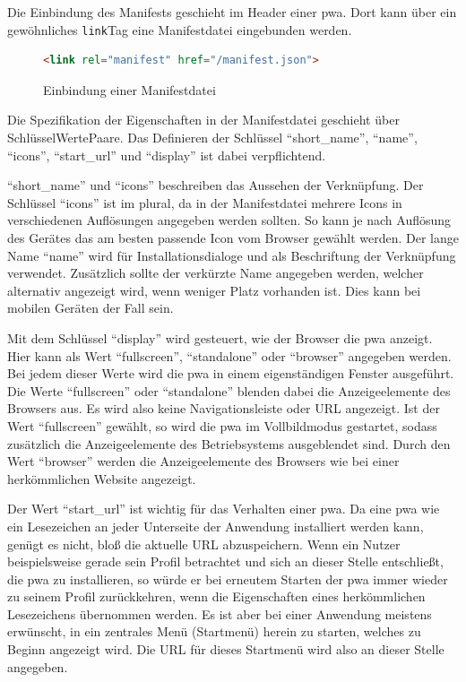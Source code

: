 \documentclass[12pt, parskip=half]{scrartcl}       %
\begin{document}
Die Einbindung des Manifests geschieht im Header einer \ac{pwa}.
Dort kann über ein gewöhnliches \texttt{link}\-Tag eine Manifestdatei eingebunden werden.

\begin{figure}[h]
\begin{lstlisting}[language=HTML]
                <link rel="manifest" href="/manifest.json">
\end{lstlisting}
\caption{Einbindung einer Manifestdatei}
\label{fig:html_linkmanifest}
\end{figure}

Die Spezifikation der Eigenschaften in der Manifestdatei geschieht über Schlüssel\-Werte\-Paare.
Das Definieren der Schlüssel \enquote{short\_name}, \enquote{name}, \enquote{icons}, \enquote{start\_url} und \enquote{display} ist dabei verpflichtend.

\enquote{short\_name} und \enquote{icons} beschreiben das Aussehen der Verknüpfung.
Der Schlüssel \enquote{icons} ist im plural, da in der Manifestdatei mehrere Icons in verschiedenen Auflösungen angegeben werden sollten.
So kann je nach Auflösung des Gerätes das am besten passende Icon vom Browser gewählt werden.
Der lange Name \enquote{name} wird für Installationsdialoge und als Beschriftung der Verknüpfung verwendet.
Zusätzlich sollte der verkürzte Name angegeben werden, welcher alternativ angezeigt wird, wenn weniger Platz vorhanden ist\cite{chromedevs_manifestname}.
Dies kann bei mobilen Geräten der Fall sein.

Mit dem Schlüssel \enquote{display} wird gesteuert, wie der Browser die \ac{pwa} anzeigt.
Hier kann als Wert \enquote{fullscreen}, \enquote{standalone} oder \enquote{browser} angegeben werden.
Bei jedem dieser Werte wird die \ac{pwa} in einem eigenständigen Fenster ausgeführt.
Die Werte \enquote{fullscreen} oder \enquote{standalone} blenden dabei die Anzeigeelemente des Browsers aus.
Es wird also keine Navigationsleiste oder URL angezeigt.
Ist der Wert \enquote{fullscreen} gewählt, so wird die \ac{pwa} im Vollbildmodus gestartet, sodass zusätzlich die Anzeigeelemente des Betriebsystems ausgeblendet sind.
Durch den Wert \enquote{browser} werden die Anzeigeelemente des Browsers wie bei einer herkömmlichen Website angezeigt\cite{googledev_manifest}.

Der Wert \enquote{start\_url} ist wichtig für das Verhalten einer \ac{pwa}.
Da eine \ac{pwa} wie ein Lesezeichen an jeder Unterseite der Anwendung installiert werden kann, genügt es nicht, bloß die aktuelle URL abzuspeichern.
Wenn ein Nutzer beispielsweise gerade sein Profil betrachtet und sich an dieser Stelle entschließt, die \ac{pwa} zu installieren, so würde er bei erneutem Starten der \ac{pwa} immer wieder zu seinem Profil zurückkehren, wenn die Eigenschaften eines herkömmlichen Lesezeichens übernommen werden.
Es ist aber bei einer Anwendung meistens erwünscht, in ein zentrales Menü (Startmenü) herein zu starten, welches zu Beginn angezeigt wird.
Die URL für dieses Startmenü wird also an dieser Stelle angegeben.
\end{document}
